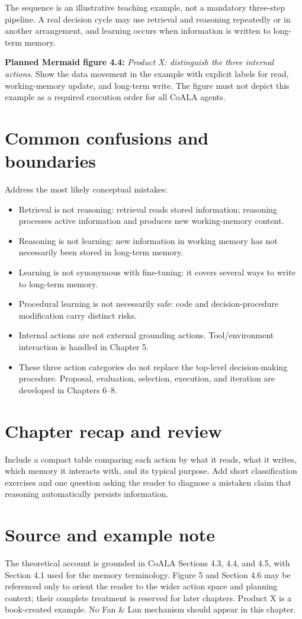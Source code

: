 The sequence is an illustrative teaching example, not a mandatory three-step pipeline. A real decision cycle may use retrieval and reasoning repeatedly or in another arrangement, and learning occurs when information is written to long-term memory.

\textbf{Planned Mermaid figure 4.4:} \emph{Product X: distinguish the three internal actions}. Show the data movement in the example with explicit labels for read, working-memory update, and long-term write. The figure must not depict this example as a required execution order for all CoALA agents.

\section{Common confusions and boundaries}
Address the most likely conceptual mistakes:
\begin{itemize}
  \item Retrieval is not reasoning: retrieval reads stored information; reasoning processes active information and produces new working-memory content.
  \item Reasoning is not learning: new information in working memory has not necessarily been stored in long-term memory.
  \item Learning is not synonymous with fine-tuning: it covers several ways to write to long-term memory.
  \item Procedural learning is not necessarily safe: code and decision-procedure modification carry distinct risks.
  \item Internal actions are not external grounding actions. Tool/environment interaction is handled in Chapter 5.
  \item These three action categories do not replace the top-level decision-making procedure. Proposal, evaluation, selection, execution, and iteration are developed in Chapters 6--8.
\end{itemize}

\section{Chapter recap and review}
Include a compact table comparing each action by what it reads, what it writes, which memory it interacts with, and its typical purpose. Add short classification exercises and one question asking the reader to diagnose a mistaken claim that reasoning automatically persists information.

\section*{Source and example note}
The theoretical account is grounded in CoALA Sections 4.3, 4.4, and 4.5, with Section 4.1 used for the memory terminology. Figure 5 and Section 4.6 may be referenced only to orient the reader to the wider action space and planning context; their complete treatment is reserved for later chapters. Product X is a book-created example. No Fan \& Lan mechanism should appear in this chapter. 


